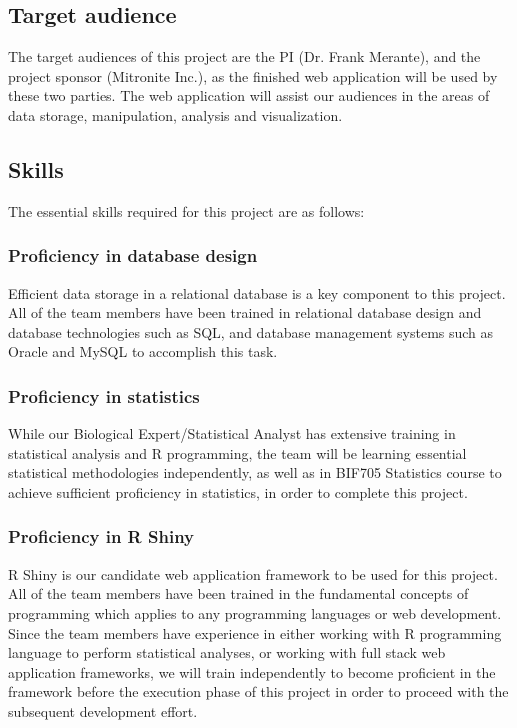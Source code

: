 \documentclass[10pt,twocolumn,letterpaper]{article}
\begin{document}
            \subsection{Target audience}
            The target audiences of this project are the PI (Dr. Frank Merante), and the project sponsor (Mitronite Inc.), as the finished web application will be used by these two 
	    parties. 
	    The web application will assist our audiences in the areas of data storage, manipulation, analysis and visualization.

            \subsection{Skills}

            The essential skills required for this project are as follows:
            \subsubsection{Proficiency in database design}
            Efficient data storage in a relational database is a key component to this project. All of the team members have been trained in relational database design and database technologies such as SQL, and database management systems such as Oracle and MySQL to accomplish this task.
            \subsubsection{Proficiency in statistics}
            While our Biological Expert/Statistical Analyst has extensive training in statistical analysis and R programming, the team will be learning essential statistical methodologies independently, as well as in BIF705 Statistics course to achieve sufficient proficiency in statistics, in order to complete this project.
            \subsubsection{Proficiency in R Shiny}
            R Shiny is our candidate web application framework to be used for this project. 
            All of the team members have been trained in the fundamental concepts of programming which applies to any programming languages or web development. 
            Since the team members have experience in either working with R programming language to perform statistical analyses, or working with full stack web application frameworks, 
	    we will train independently to become proficient in the framework before the execution phase of this project in order to proceed with the subsequent development effort.
\end{document}
